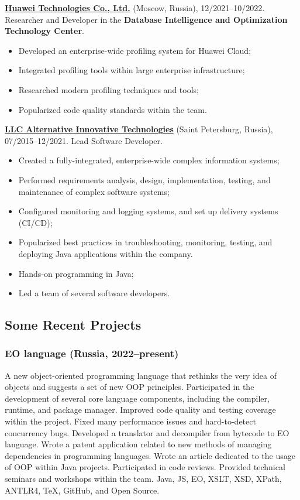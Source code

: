 \documentclass{vl}
\begin{document}
    \textbf{\href{https://www.huawei.com}{Huawei Technologies Co., Ltd.}} (Moscow, Russia), 12/2021--10/2022.\newline
    Researcher and Developer in the \textbf{Database Intelligence and Optimization Technology Center}.

    \begin{itemize}
        \item Developed an enterprise-wide profiling system for Huawei Cloud;
        \item Integrated profiling tools within large enterprise infrastructure;
        \item Researched modern profiling techniques and tools;
        \item Popularized code quality standards within the team.
    \end{itemize}

    \textbf{\href{https://altinntech.com/en/}{LLC Alternative Innovative Technologies}} (Saint Petersburg, Russia),
    07/2015--12/2021.
    Lead Software Developer.

    \begin{itemize}
        \item Created a fully-integrated, enterprise-wide complex information systems;
        \item Performed requirements analysis, design, implementation, testing, and maintenance of complex software
        systems;
        \item Configured monitoring and logging systems, and set up delivery systems (CI/CD);
        \item Popularized best practices in troubleshooting, monitoring, testing, and deploying Java applications
        within the company.
        \item Hands-on programming in Java;
        \item Led a team of several software developers.
    \end{itemize}

    \subsection*{Some Recent Projects}

    \subsubsection*{EO language (Russia, 2022--present)}
    A new object-oriented programming language
    that rethinks the very idea of objects and suggests a set of new OOP principles.
    Participated in the development of several core language components,
    including the compiler, runtime, and package manager.
    Improved code quality and testing coverage within the project.
    Fixed many performance issues and hard-to-detect concurrency bugs.
    Developed a translator and decompiler from bytecode to EO language.
    Wrote a patent application related to new methods of managing dependencies in programming languages.
    Wrote an article dedicated to the usage of OOP within Java projects.
    Participated in code reviews.
    Provided technical seminars and workshops within the team.
    Java, JS, EO, XSLT, XSD, XPath, ANTLR4, TeX, GitHub, and Open Source.
\end{document}
